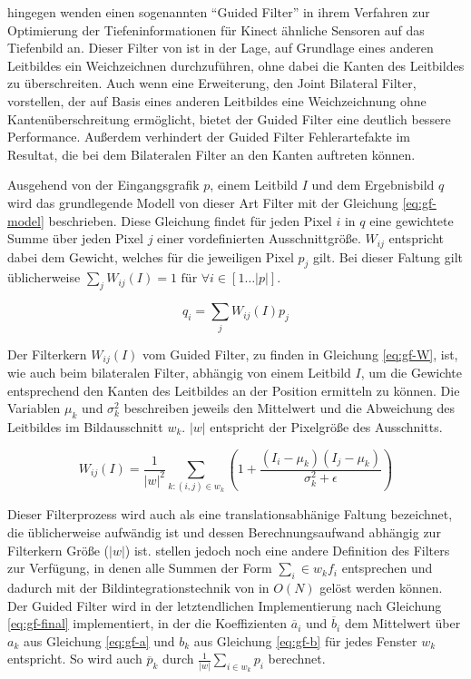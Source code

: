 \citet{liu2012guided} hingegen wenden einen sogenannten \enquote{Guided Filter} in ihrem Verfahren zur Optimierung der Tiefeninformationen für Kinect ähnliche Sensoren auf das Tiefenbild an. Dieser Filter von \citet{he2010guided} ist in der Lage, auf Grundlage eines anderen Leitbildes ein Weichzeichnen durchzuführen, ohne dabei die Kanten des Leitbildes zu überschreiten. Auch wenn \citet{petschnigg2004digital} eine Erweiterung, den Joint Bilateral Filter, vorstellen, der auf Basis eines anderen Leitbildes eine Weichzeichnung ohne Kantenüberschreitung ermöglicht, bietet der Guided Filter eine deutlich bessere Performance. Außerdem verhindert der Guided Filter Fehlerartefakte im Resultat, die bei dem Bilateralen Filter an den Kanten auftreten können. \citep{he2010guided} 

Ausgehend von der Eingangsgrafik \(p\), einem Leitbild \(I\) und dem Ergebnisbild \(q\) wird das grundlegende Modell von dieser Art Filter mit der Gleichung \ref{eq:gf-model} beschrieben. Diese Gleichung findet für jeden Pixel \(i\) in \(q\) eine gewichtete Summe über jeden Pixel \(j\) einer vordefinierten Ausschnittgröße. \(W_{ij}\) entspricht dabei dem Gewicht, welches für die jeweiligen Pixel \(p_j\) gilt. Bei dieser Faltung gilt üblicherweise  \(\sum_{j} W_{ij}(I)=1  \text{ für } \forall i \in [1\ldots |p|]\). \citep{he2010guided}

\begin{equation} \label{eq:gf-model}
q_{i} = \sum_j W_{ij}(I)p_j
\end{equation}

Der Filterkern \(W_{ij}(I)\) vom Guided Filter, zu finden in Gleichung \ref{eq:gf-W}, ist, wie auch beim bilateralen Filter, abhängig von einem Leitbild \(I\), um die Gewichte entsprechend den Kanten des Leitbildes an der Position ermitteln zu können. Die Variablen \(\mu_k\) und \(\sigma^2_k\) beschreiben jeweils den Mittelwert und die Abweichung des Leitbildes im Bildausschnitt \(w_k\). \(|w|\) entspricht der Pixelgröße des Ausschnitts. \citep{he2010guided}

\begin{equation} \label{eq:gf-W}
W_{ij}(I) = \frac{1}{|w|^2} \sum_{k:(i,j) \in w_k} (1+\frac{(I_i-\mu_k)(I_j-\mu_k)}{\sigma^2_k + \epsilon})
\end{equation}

Dieser Filterprozess wird auch als eine translationsabhänige Faltung bezeichnet, die üblicherweise aufwändig ist und dessen Berechnungsaufwand abhängig zur Filterkern Größe (\(|w|\)) ist. \citet{he2010guided} stellen jedoch noch eine andere Definition des Filters zur Verfügung, in denen alle Summen der Form \(\sum_i\in w_k f_i\) entsprechen und dadurch mit der Bildintegrationstechnik von \citet{crow1984summed} in \(O(N)\) gelöst werden können. Der Guided Filter wird in der letztendlichen Implementierung nach Gleichung \ref{eq:gf-final} implementiert, in der die Koeffizienten \(\overline{a}_i\) und \(\overline{b}_i\) dem Mittelwert über \(a_k\) aus Gleichung \ref{eq:gf-a} und \(b_k\) aus Gleichung \ref{eq:gf-b} für jedes Fenster \(w_k\) entspricht. So wird auch \(\overline{p}_k\) durch \(\frac{1}{|w|} \sum_{i \in w_k} p_i\) berechnet.

